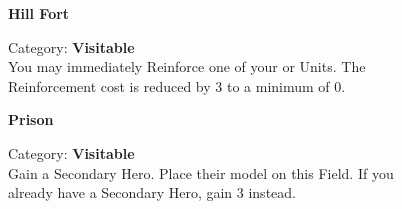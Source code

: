 \begin{figure}[H]
  \begin{minipage}[t]{0.47\textwidth}
    \vspace{0pt}
    \centering
    \phantom{j}\textbf{Hill Fort}\par
    \caption{\small Category: \textbf{Visitable}\\
      You may immediately Reinforce one of your  or  Units.
      The Reinforcement cost is reduced by 3  to a minimum of 0.}
  \end{minipage}\hfill
  \begin{minipage}[t]{0.47\textwidth}
    \vspace{0pt}
    \centering
    \phantom{j}\textbf{Prison}\par
    \caption{\small Category: \textbf{Visitable}\\
      Gain a Secondary Hero.
      Place their model on this Field.
      If you already have a Secondary Hero, gain 3  instead.}
  \end{minipage}
\end{figure}

